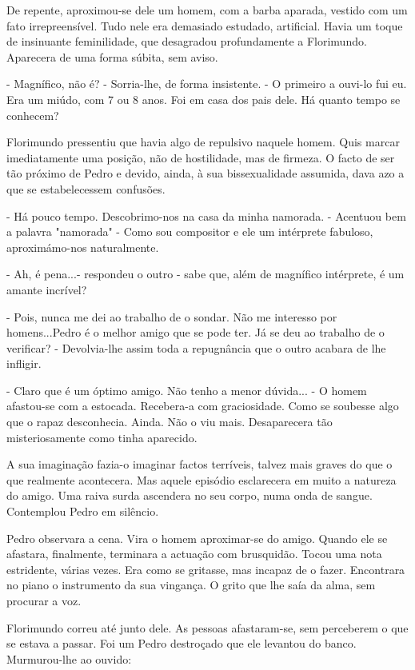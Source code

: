 De repente, aproximou-se dele um homem, com a barba aparada, vestido com
um fato irrepreensível. Tudo nele era demasiado estudado, artificial.
Havia um toque de insinuante feminilidade, que desagradou profundamente
a Florimundo. Aparecera de uma forma súbita, sem aviso.

- Magnífico, não é? - Sorria-lhe, de forma insistente. - O primeiro a
ouvi-lo fui eu. Era um miúdo, com 7 ou 8 anos. Foi em casa dos pais
dele. Há quanto tempo se conhecem?

Florimundo pressentiu que havia algo de repulsivo naquele homem. Quis
marcar imediatamente uma posição, não de hostilidade, mas de firmeza. O
facto de ser tão próximo de Pedro e devido, ainda, à sua bissexualidade
assumida, dava azo a que se estabelecessem confusões.

- Há pouco tempo. Descobrimo-nos na casa da minha namorada. - Acentuou
bem a palavra "namorada" - Como sou compositor e ele um intérprete
fabuloso, aproximámo-nos naturalmente.

- Ah, é pena...- respondeu o outro - sabe que, além de magnífico
intérprete, é um amante incrível?

- Pois, nunca me dei ao trabalho de o sondar. Não me interesso por
homens...Pedro é o melhor amigo que se pode ter. Já se deu ao trabalho
de o verificar? - Devolvia-lhe assim toda a repugnância que o outro
acabara de lhe infligir.

- Claro que é um óptimo amigo. Não tenho a menor dúvida... - O homem
afastou-se com a estocada. Recebera-a com graciosidade. Como se soubesse
algo que o rapaz desconhecia. Ainda. Não o viu mais. Desaparecera tão
misteriosamente como tinha aparecido.

A sua imaginação fazia-o imaginar factos terríveis, talvez mais graves
do que o que realmente acontecera. Mas aquele episódio esclarecera em
muito a natureza do amigo. Uma raiva surda ascendera no seu corpo, numa
onda de sangue. Contemplou Pedro em silêncio.

Pedro observara a cena. Vira o homem aproximar-se do amigo. Quando ele
se afastara, finalmente, terminara a actuação com brusquidão. Tocou uma
nota estridente, várias vezes. Era como se gritasse, mas incapaz de o
fazer. Encontrara no piano o instrumento da sua vingança. O grito que
lhe saía da alma, sem procurar a voz.

Florimundo correu até junto dele. As pessoas afastaram-se, sem
perceberem o que se estava a passar. Foi um Pedro destroçado que ele
levantou do banco. Murmurou-lhe ao ouvido:

